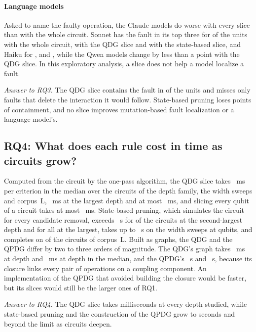 \paragraph*{Language models}
Asked to name the faulty operation, the Claude models do worse with every slice than with the whole circuit. Sonnet has the fault in its top three for
\numTTwoSonnetFull{} of the units with the whole circuit, \numTTwoSonnetLc{} with the QDG slice and \numTTwoSonnetQ{}
with the state-based slice, and Haiku for \numTTwoHaikuFull{}, \numTTwoHaikuLc{} and \numTTwoHaikuQ{}, while the Qwen
models change by less than a point with the QDG slice. In this exploratory analysis, a slice does not help a model localize a fault.

\emph{Answer to RQ3.} The QDG slice contains the fault in \numRqThreeContainLc{} of the units and misses only faults
that delete the interaction it would follow. State-based pruning loses \numHFourDiffAbs{} points of containment, and
no slice improves mutation-based fault localization or a language model's.

\subsection{RQ4: What does each rule cost in time as circuits grow?}

Computed from the circuit by the one-pass algorithm, the QDG slice takes \numOnePassMedianMs{}~ms per criterion in the
median over the \numOnePassCircuits{} circuits of the depth family, the width sweeps and corpus~L,
\numOnePassDeepMedianMs{}~ms at the largest depth and at most \numOnePassMaxMs{}~ms, and slicing every qubit of a
circuit takes at most \numOnePassAllMaxMs{}~ms.
State-based pruning, which simulates the circuit for every candidate removal, exceeds \numCostWallLimit{}~s for \numCostDepthEightyOverLimit{} of the \numCostDepthCircuits{} circuits at the second-largest depth and for all
\numCostDepthOneSixtyOverLimit{} at the largest, takes up to \numCostWidthQMax{}~s on the width sweeps at
\numCostWidthMaxQubits{} qubits, and completes on
\numCorpusLCompleted{} of the \numCorpusLCircuits{} circuits of corpus~L. Built as graphs, the QDG and the QPDG differ by two to three orders of magnitude. The QDG's graph takes
\numQdgBuildDepthFortyMs{}~ms at depth \numCostMeasuredDepthForty{} and \numQdgBuildDepthOneSixtyMs{}~ms at depth
\numCostMeasuredDepthOneSixty{} in the median, and the QPDG's \numCostBuildDepthForty{}~s and
\numCostBuildDepthOneSixty{}~s, because its closure links every pair of operations on a coupling component. An
implementation of the QPDG that avoided building the closure would be faster, but its slices would still be the larger
ones of RQ1.

\emph{Answer to RQ4.} The QDG slice takes milliseconds at every depth studied, while state-based pruning and the
construction of the QPDG grow to seconds and beyond the limit as circuits deepen.
